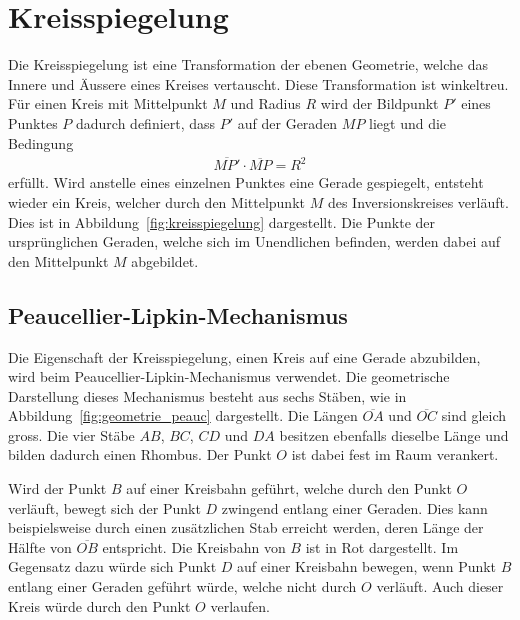 %
%
%
%
\section{Kreisspiegelung\label{geradlinig:section:kreisspiegelung}}
Die Kreisspiegelung ist eine Transformation der ebenen Geometrie, 
welche das Innere und Äussere eines Kreises vertauscht.
Diese Transformation ist winkeltreu.
Für einen Kreis mit Mittelpunkt $M$ und Radius $R$ wird der Bildpunkt $P'$ 
eines Punktes $P$ dadurch definiert, 
dass $P'$ auf der Geraden $MP$ liegt und die Bedingung
\begin{align}
    \overline{MP'}\cdot\overline{MP} = R^2
    \label{eq:constant0}
\end{align}
erfüllt.
Wird anstelle eines einzelnen Punktes eine Gerade gespiegelt, 
entsteht wieder ein Kreis, 
welcher durch den Mittelpunkt $M$ des Inversionskreises verläuft.
%
Dies ist in Abbildung~\ref{fig:kreisspiegelung} dargestellt.
Die Punkte der ursprünglichen Geraden, welche sich im Unendlichen befinden, 
werden dabei auf den Mittelpunkt $M$ abgebildet.


\subsection{Peaucellier-Lipkin-Mechanismus}
Die Eigenschaft der Kreisspiegelung, einen Kreis auf eine Gerade abzubilden,
wird beim Peaucellier-Lipkin-Mechanismus verwendet.
Die geometrische Darstellung dieses Mechanismus besteht aus sechs Stäben, 
wie in Abbildung~\ref{fig:geometrie_peauc} dargestellt.
Die Längen $\overline{OA}$ und $\overline{OC}$ sind gleich gross.
Die vier Stäbe $AB$, $BC$, $CD$ und $DA$ 
besitzen ebenfalls dieselbe Länge und bilden dadurch einen Rhombus.
Der Punkt $O$ ist dabei fest im Raum verankert.

Wird der Punkt $B$ auf einer Kreisbahn geführt, 
welche durch den Punkt $O$ verläuft, 
bewegt sich der Punkt $D$ zwingend entlang einer Geraden.
Dies kann beispielsweise durch einen zusätzlichen Stab erreicht werden, 
deren Länge der Hälfte von $\overline{OB}$ entspricht.
Die Kreisbahn von $B$ ist in Rot dargestellt.
Im Gegensatz dazu würde sich Punkt $D$ auf einer Kreisbahn bewegen, 
wenn Punkt $B$ entlang einer Geraden geführt würde, 
welche nicht durch $O$ verläuft.
Auch dieser Kreis würde durch den Punkt $O$ verlaufen.

